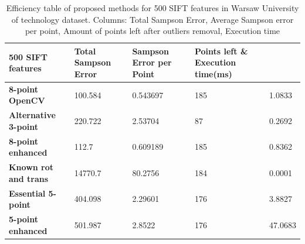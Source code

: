 \begin{table}[p]
\centering
\begin{adjustbox}{width=1\linewidth}
\begin{tabular}{l|l|l|l|l}
\textbf{500 SIFT features}   & \textbf{Total Sampson Error} & \textbf{Sampson Error per Point} & \textbf{Points left} \& \textbf{Execution time(ms)} \\ \hline
\textbf{8-point OpenCV}      & 100.584             & 0.543697                & 185         & 1.0833             \\ \hline
\textbf{Alternative 3-point} & 220.722             & 2.53704                 & 87          & 0.2692             \\ \hline
\textbf{8-point enhanced}    & 112.7               & 0.609189                & 185         & 0.8362             \\ \hline
\textbf{Known rot and trans} & 14770.7             & 80.2756                 & 184         & 0.0001             \\ \hline
\textbf{Essential 5-point}   & 404.098             & 2.29601                 & 176         & 3.8827             \\ \hline
\textbf{5-point enhanced}    & 501.987             & 2.8522                  & 176         & 47.0683            \\
\end{tabular}
\end{adjustbox}
\caption[Efficiency table of proposed methods for 500 SIFT features in Warsaw University of technology dataset]{Efficiency table of proposed methods for 500 SIFT features in Warsaw University of technology dataset. Columns: Total Sampson Error, Average Sampson error per point, Amount of points left after outliers removal, Execution time}
\label{table:Efficiency500Sift}
\end{table}

